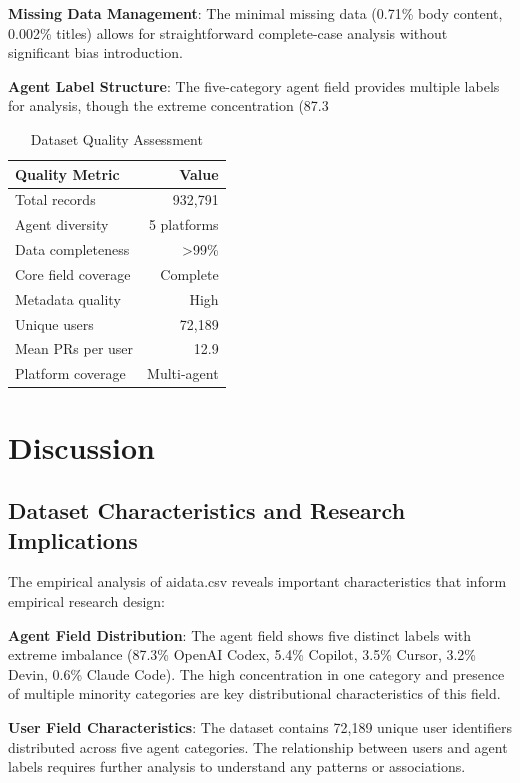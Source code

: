 \documentclass[conference]{IEEEtran}
\begin{document}
\textbf{Missing Data Management}: The minimal missing data (0.71\% body content, 0.002\% titles) allows for straightforward complete-case analysis without significant bias introduction.

\textbf{Agent Label Structure}: The five-category agent field provides multiple labels for analysis, though the extreme concentration (87.3%

\begin{table}[t]
\centering
\caption{Dataset Quality Assessment}
\label{tab:quality_assessment}
\begin{tabular}{@{}lr@{}}
\toprule
\textbf{Quality Metric} & \textbf{Value} \\
\midrule
Total records & 932,791 \\
Agent diversity & 5 platforms \\
Data completeness & >99\% \\
Core field coverage & Complete \\
Metadata quality & High \\
Unique users & 72,189 \\
Mean PRs per user & 12.9 \\
Platform coverage & Multi-agent \\
\bottomrule
\end{tabular}
\end{table}

\section{Discussion}

\subsection{Dataset Characteristics and Research Implications}

The empirical analysis of aidata.csv reveals important characteristics that inform empirical research design:

\textbf{Agent Field Distribution}: The agent field shows five distinct labels with extreme imbalance (87.3\% OpenAI Codex, 5.4\% Copilot, 3.5\% Cursor, 3.2\% Devin, 0.6\% Claude Code). The high concentration in one category and presence of multiple minority categories are key distributional characteristics of this field.

\textbf{User Field Characteristics}: The dataset contains 72,189 unique user identifiers distributed across five agent categories. The relationship between users and agent labels requires further analysis to understand any patterns or associations.
\end{document}
